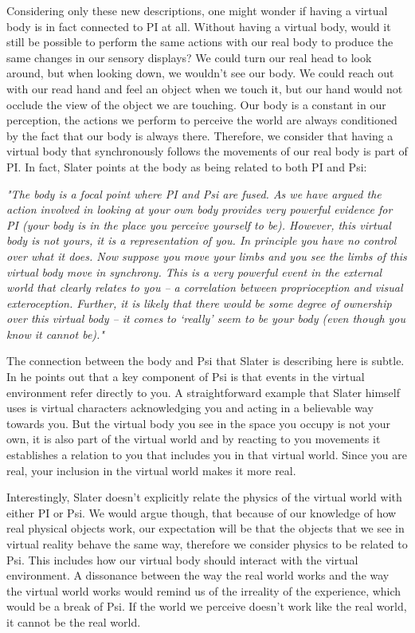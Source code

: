 Considering only these new descriptions, one might wonder if having a virtual body is in fact connected to PI at all. Without having a virtual body, would it still be possible to perform the same actions with our real body to produce the same changes in our sensory displays? We could turn our real head to look around, but when looking down, we wouldn't see our body. We could reach out with our read hand and feel an object when we touch it, but our hand would not occlude the view of the object we are touching. Our body is a constant in our perception, the actions we perform to perceive the world are always conditioned by the fact that our body is always there. Therefore, we consider that having a virtual body that synchronously follows the movements of our real body is part of PI. In fact, Slater points at the body as being related to both PI and Psi:

\begin{displayquote}
\textit{"The body is a focal point where PI and Psi are fused. As we have argued the action involved in looking at your own body provides very powerful evidence for PI (your body is in the place you perceive yourself to be). However, this virtual body is not yours, it is a representation of you. In principle you have no control over what it does. Now suppose you move your limbs and you see the limbs of this virtual body move in synchrony. This is a very powerful event in the external world that clearly relates to you – a correlation between proprioception and visual exteroception. Further, it is likely that there would be some degree of ownership over this virtual body – it comes to ‘really’ seem to be your body (even though you know it cannot be)."} \parencite{Slater2009}
\end{displayquote}

The connection between the body and Psi that Slater is describing here is subtle. In \parencite{Slater2009} he points out that a key component of Psi is that events in the virtual environment refer directly to you. A straightforward example that Slater himself uses is virtual characters acknowledging you and acting in a believable way towards you. But the virtual body you see in the space you occupy is not your own, it is also part of the virtual world and by reacting to you movements it establishes a relation to you that includes you in that virtual world. Since you are real, your inclusion in the virtual world makes it more real.

Interestingly, Slater doesn't explicitly relate the physics of the virtual world with either PI or Psi. We would argue though, that because of our knowledge of how real physical objects work, our expectation will be that the objects that we see in virtual reality behave the same way, therefore we consider physics to be related to Psi. This includes how our virtual body should interact with the virtual environment. A dissonance between the way the real world works and the way the virtual world works would remind us of the irreality of the experience, which would be a break of Psi. If the world we perceive doesn't work like the real world, it cannot be the real world. 

